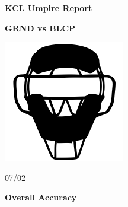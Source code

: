 \documentclass[
]{article}
\author{}
\date{\vspace{-2.5em}}
\begin{document}
\vspace*{-8em}
\begin{center}
\vspace*{-1em}
\LARGE \textbf{KCL Umpire Report}
\vspace*{-1em}
\end{center}

\begin{center}
\begin{minipage}{0.28\textwidth}
\centering
\Large \textbf{GRND vs BLCP}
\end{minipage}
\hfill
\begin{minipage}{0.28\textwidth}
\centering
\includegraphics[width=\textwidth]{ump-mask.png}
\end{minipage}
\hfill
\begin{minipage}{0.28\textwidth}
\centering
\Large 07/02
\end{minipage}
\vspace*{-1em}
\end{center}

\begin{center}
\centering
\vspace{1em}
\Large \textbf{Overall Accuracy}
\end{center}
\end{document}

